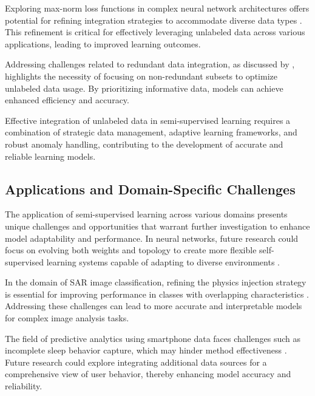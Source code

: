 Exploring max-norm loss functions in complex neural network architectures offers potential for refining integration strategies to accommodate diverse data types \cite{peiris2021deeplearningnonsmoothobjectives}. This refinement is critical for effectively leveraging unlabeled data across various applications, leading to improved learning outcomes.

Addressing challenges related to redundant data integration, as discussed by \cite{williams2018nonpenalizedvariableselectionhighdimensional}, highlights the necessity of focusing on non-redundant subsets to optimize unlabeled data usage. By prioritizing informative data, models can achieve enhanced efficiency and accuracy.

Effective integration of unlabeled data in semi-supervised learning requires a combination of strategic data management, adaptive learning frameworks, and robust anomaly handling, contributing to the development of accurate and reliable learning models.

\subsection{Applications and Domain-Specific Challenges} \label{subsec:Applications and Domain-Specific Challenges}

The application of semi-supervised learning across various domains presents unique challenges and opportunities that warrant further investigation to enhance model adaptability and performance. In neural networks, future research could focus on evolving both weights and topology to create more flexible self-supervised learning systems capable of adapting to diverse environments \cite{le2019evolvingselfsupervisedneuralnetworks}.

In the domain of SAR image classification, refining the physics injection strategy is essential for improving performance in classes with overlapping characteristics \cite{huang2022physicallyexplainablecnnsar}. Addressing these challenges can lead to more accurate and interpretable models for complex image analysis tasks.

The field of predictive analytics using smartphone data faces challenges such as incomplete sleep behavior capture, which may hinder method effectiveness \cite{jeong2016predictiveanalyticsusingsmartphone}. Future research could explore integrating additional data sources for a comprehensive view of user behavior, thereby enhancing model accuracy and reliability.

